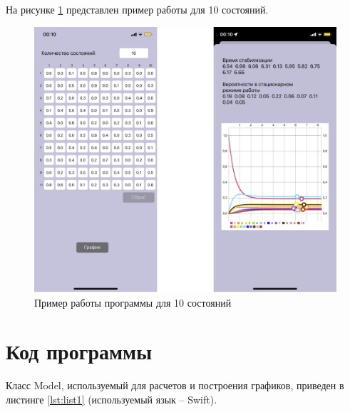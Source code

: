 \documentclass[14pt, a4paper]{extarticle}
\begin{document}
На рисунке \ref{pic:10} представлен пример работы для 10 состояний.

\begin{figure}[h]
	\begin{center}
		{\includegraphics[scale=0.12]{pictures/10.png}
			\caption{Пример работы программы для 10 состояний}
			\label{pic:10}}
	\end{center}
\end{figure}

\newpage
\section{Код программы}

Класс Model, используемый для расчетов и построения графиков, приведен в листинге \ref{lst:list1} (используемый язык -- Swift).
\end{document}

